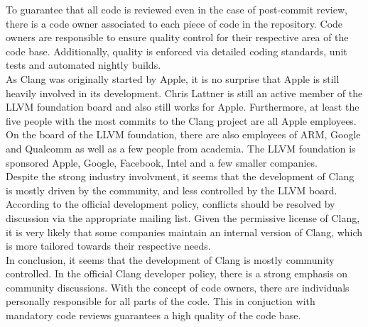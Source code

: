 To guarantee that all code is reviewed even in the case of post-commit review, there is a code owner associated to each piece of code in the repository. Code owners are responsible to ensure quality control for their respective area of the code base. Additionally, quality is enforced via detailed coding standards, unit tests and automated nightly builds. \\

As Clang was originally started by Apple, it is no surprise that Apple is still heavily involved in its development. Chris Lattner is still an active member of the LLVM foundation board and also still works for Apple.\cite{lattner} Furthermore, at least the five people with the most commits to the Clang project are all Apple employees.\cite{clang-commits} On the board of the LLVM foundation, there are also employees of ARM, Google and Qualcomm as well as a few people from academia.\cite{llvm-board} The LLVM foundation is sponsored Apple, Google, Facebook, Intel and a few smaller companies.\cite{llvm-sponsors} \\

Despite the strong industry involvment, it seems that the development of Clang is mostly driven by the community, and less controlled by the LLVM board. According to the official development policy, conflicts should be resolved by discussion via the appropriate mailing list.\cite{clang-policy} Given the permissive license of Clang, it is very likely that some companies maintain an internal version of Clang, which is more tailored towards their respective needs. \\

In conclusion, it seems that the development of Clang is mostly community controlled. In the official Clang developer policy, there is a strong emphasis on community discussions. With the concept of code owners, there are individuals personally responsible for all parts of the code. This in conjuction with mandatory code reviews guarantees a high quality of the code base.



